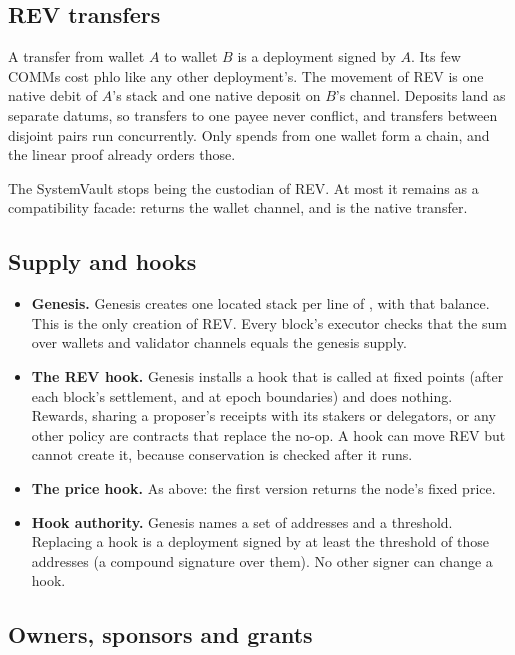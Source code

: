 \documentclass[11pt]{article}
\newcommand{\code}{\path}
\begin{document}
\subsection{REV transfers}

A transfer from wallet $A$ to wallet $B$ is a deployment signed by $A$. Its few COMMs cost phlo like any other deployment's. The movement of REV is one native debit of $A$'s stack and one native deposit on $B$'s channel. Deposits land as separate datums, so transfers to one payee never conflict, and transfers between disjoint pairs run concurrently. Only spends from one wallet form a chain, and the linear proof already orders those.

The SystemVault stops being the custodian of REV. At most it remains as a compatibility facade: \code{find} returns the wallet channel, and \code{transfer} is the native transfer.

\subsection{Supply and hooks}

\begin{itemize}
\item \textbf{Genesis.} Genesis creates one located stack per line of \code{wallets.txt}, with that balance. This is the only creation of REV. Every block's executor checks that the sum over wallets and validator channels equals the genesis supply.
\item \textbf{The REV hook.} Genesis installs a hook that is called at fixed points (after each block's settlement, and at epoch boundaries) and does nothing. Rewards, sharing a proposer's receipts with its stakers or delegators, or any other policy are contracts that replace the no-op. A hook can move REV but cannot create it, because conservation is checked after it runs.
\item \textbf{The price hook.} As above: the first version returns the node's fixed price.
\item \textbf{Hook authority.} Genesis names a set of addresses and a threshold. Replacing a hook is a deployment signed by at least the threshold of those addresses (a compound signature over them). No other signer can change a hook.
\end{itemize}

\subsection{Owners, sponsors and grants}
\end{document}
